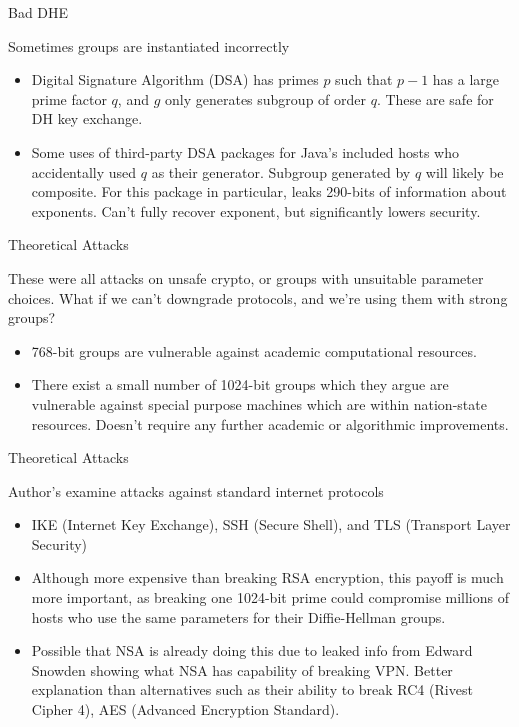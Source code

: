 \documentclass[presentation, aspectratio=54]{beamer}
\begin{document}
\begin{frame}{Bad DHE}

Sometimes groups are instantiated incorrectly
\begin{itemize}
\item Digital Signature Algorithm (DSA) has primes $p$ such that $p-1$ has a
      large prime factor $q$, and $g$ only generates subgroup of order $q$.
      These are safe for DH key exchange.
\item Some uses of third-party DSA packages for Java's included hosts who
      accidentally used $q$ as their generator. Subgroup generated by $q$ will
      likely be composite. For this package in particular, leaks 290-bits of
      information about exponents. Can't fully recover exponent, but
      significantly lowers security.
\end{itemize}

\end{frame}


\begin{frame}{Theoretical Attacks}

These were all attacks on unsafe crypto, or groups with unsuitable parameter
choices. What if we can't downgrade protocols, and we're using them with strong
groups?
\begin{itemize}
\item 768-bit groups are vulnerable against academic computational resources.
\item There exist a small number of 1024-bit groups which they argue are
      vulnerable against special purpose machines which are within nation-state
      resources. Doesn't require any further academic or algorithmic
      improvements.
\end{itemize}

\end{frame}


\begin{frame}{Theoretical Attacks}

Author's examine attacks against standard internet protocols
\begin{itemize}
\item IKE (Internet Key Exchange), SSH (Secure Shell), and TLS (Transport Layer
      Security)
\item Although more expensive than breaking RSA encryption, this payoff is much
      more important, as breaking one 1024-bit prime could compromise millions
      of hosts who use the same parameters for their Diffie-Hellman groups.
\item Possible that NSA is already doing this due to leaked info from Edward
      Snowden showing what NSA has capability of breaking VPN. Better
      explanation than alternatives such as their ability to break RC4 (Rivest
      Cipher 4), AES (Advanced Encryption Standard). 
\end{itemize}

\end{frame}
\end{document}
